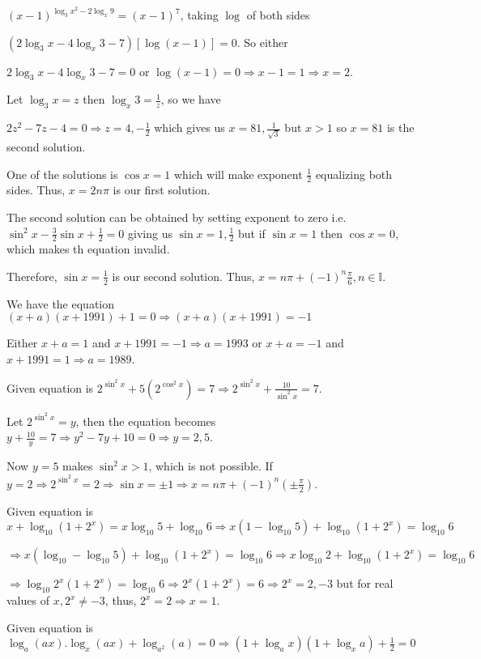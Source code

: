   $(x - 1)^{\log_3x^2 - 2\log_x9} = (x - 1)^7$, taking $\log$ of both sides

  $(2\log_3x - 4\log_x3 - 7)[\log(x - 1)] = 0$. So either

  $2\log_3x - 4\log_x3 - 7 = 0$ or $\log(x - 1) = 0 \Rightarrow x - 1 = 1 \Rightarrow x = 2$.

  Let $\log_3x = z$ then $\log_x3 = \frac{1}{z}$, so we have

  $2z^2 - 7z - 4 = 0 \Rightarrow z = 4, -\frac{1}{2}$ which gives us $x = 81, \frac{1}{\sqrt{3}}$ but $x >
  1$ so $x = 81$ is the second solution.
\item One of the solutions is $\cos x = 1$ which will make exponent $\frac{1}{2}$ equalizing both
  sides. Thus, $x = 2n\pi$ is our first solution.

  The second solution can be obtained by setting exponent to zero i.e. $\sin^2x - \frac{3}{2}\sin x +
  \frac{1}{2} = 0$ giving us $\sin x = 1, \frac{1}{2}$ but if $\sin x = 1$ then $\cos x = 0$, which makes th
  equation invalid.

  Therefore, $\sin x = \frac{1}{2}$ is our second solution. Thus, $x = n\pi + (-1)^n\frac{\pi}{6},
  n\in\mathbb{I}$.
\item We have the equation $(x + a)(x + 1991) + 1 = 0 \Rightarrow (x + a)(x + 1991) = -1$

  Either $x + a = 1$ and $x + 1991 = -1\Rightarrow a = 1993$ or $x + a = -1$ and $x + 1991 = 1\Rightarrow a
  = 1989$.
\item Given equation is $2^{\sin^2x} + 5(2^{\cos^2x}) = 7 \Rightarrow 2^{\sin^2x} + \frac{10}{\sin^2x} = 7$.

  Let $2^{\sin^2x} = y$, then the equation becomes $y + \frac{10}{y} = 7 \Rightarrow y^2 - 7y + 10 = 0
  \Rightarrow y = 2, 5$.

  Now $y = 5$ makes $\sin^2x > 1$, which is not possible. If $y = 2\Rightarrow 2^{\sin^2x} = 2\Rightarrow
  \sin x = \pm1 \Rightarrow x = n\pi + (-1)^n\left(\pm\frac{\pi}{2}\right)$.
\item Given equation is $x + \log_{10}(1 + 2^x) = x\log_{10}5 + \log_{10}6 \Rightarrow x(1 - \log_{10}5) +
  \log_{10}(1 + 2^x) = \log_{10}6$

  $\Rightarrow x(\log_{10} - \log_{10}5) + \log_{10}(1 + 2^x) = \log_{10}6 \Rightarrow x\log_{10}2 +
  \log_{10}(1 + 2^x) = \log_{10}6$

  $\Rightarrow \log_{10}2^x(1 + 2^x) = \log_{10}6\Rightarrow 2^x(1 + 2^x) = 6\Rightarrow 2^x = 2, -3$ but
  for real values of $x, 2^x\neq -3$, thus, $2^x = 2 \Rightarrow x = 1$.
\item Given equation is $\log_a(ax).\log_x(ax) + \log_{a^2}(a) = 0\Rightarrow (1 + \log_ax)(1 + \log_xa) +
  \frac{1}{2} = 0$

